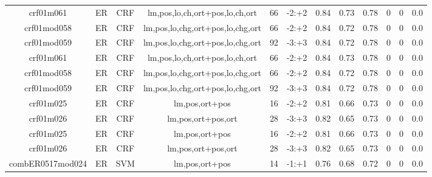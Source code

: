 \documentclass[a4paper]{article}
\begin{document}
\begin{landscape}
\begin{center}
\begin{tabular}{ |c|c|c|c|c|c|c|c|c|c|c|c|}
 
 	
 	\small{ crf01m061 } & ER & CRF & lm,pos,lo,ch,ort+pos,lo,ch,ort  &  66 &  -2:+2  &  0.84 & 0.73 & 0.78  &  0 & 0 & 0.0 \\
 	

 
 	
 	\small{ crf01mod058 } & ER & CRF & lm,pos,lo,chg,ort+pos,lo,chg,ort  &  66 &  -2:+2  &  0.84 & 0.72 & 0.78  &  0 & 0 & 0.0 \\
 	

 
 	
 	\small{ crf01mod059 } & ER & CRF & lm,pos,lo,chg,ort+pos,lo,chg,ort  &  92 &  -3:+3  &  0.84 & 0.72 & 0.78  &  0 & 0 & 0.0 \\
 	

 
 	
 	\small{ crf01m061 } & ER & CRF & lm,pos,lo,ch,ort+pos,lo,ch,ort  &  66 &  -2:+2  &  0.84 & 0.73 & 0.78  &  0 & 0 & 0.0 \\
 	

 
 	
 	\small{ crf01mod058 } & ER & CRF & lm,pos,lo,chg,ort+pos,lo,chg,ort  &  66 &  -2:+2  &  0.84 & 0.72 & 0.78  &  0 & 0 & 0.0 \\
 	

 
 	
 	\small{ crf01mod059 } & ER & CRF & lm,pos,lo,chg,ort+pos,lo,chg,ort  &  92 &  -3:+3  &  0.84 & 0.72 & 0.78  &  0 & 0 & 0.0 \\
 	

 
 	
 	\small{ crf01m025 } & ER & CRF & lm,pos,ort+pos  &  16 &  -2:+2  &  0.81 & 0.66 & 0.73  &  0 & 0 & 0.0 \\
 	

 
 	
 	\small{ crf01m026 } & ER & CRF & lm,pos,ort+pos,ort  &  28 &  -3:+3  &  0.82 & 0.65 & 0.73  &  0 & 0 & 0.0 \\
 	

 
 	
 	\small{ crf01m025 } & ER & CRF & lm,pos,ort+pos  &  16 &  -2:+2  &  0.81 & 0.66 & 0.73  &  0 & 0 & 0.0 \\
 	

 
 	
 	\small{ crf01m026 } & ER & CRF & lm,pos,ort+pos,ort  &  28 &  -3:+3  &  0.82 & 0.65 & 0.73  &  0 & 0 & 0.0 \\
 	

 
 	
 	\small{ combER0517mod024 } & ER & SVM & lm,pos,ort+pos  &  14 &  -1:+1  &  0.76 & 0.68 & 0.72  &  0 & 0 & 0.0 \\
 	


\end{tabular}
\end{center}
\end{landscape}
\end{document}
